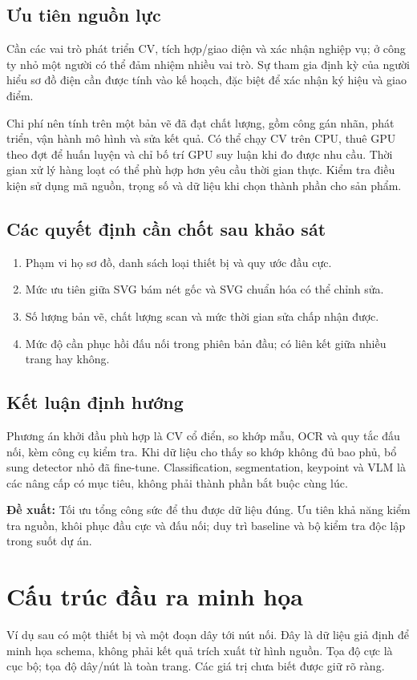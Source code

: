 \documentclass[11pt,a4paper]{article}
\newcommand{\decision}[1]{\par\smallskip\noindent\colorbox{Pale}{\parbox{\dimexpr\linewidth-2\fboxsep\relax}{\textbf{Đề xuất:} #1}}\par\smallskip}
\begin{document}
\subsection{Ưu tiên nguồn lực}
Cần các vai trò phát triển CV, tích hợp/giao diện và xác nhận nghiệp vụ; ở công ty nhỏ một người có thể đảm nhiệm nhiều vai trò. Sự tham gia định kỳ của người hiểu sơ đồ điện cần được tính vào kế hoạch, đặc biệt để xác nhận ký hiệu và giao điểm.

Chi phí nên tính trên một bản vẽ đã đạt chất lượng, gồm công gán nhãn, phát triển, vận hành mô hình và sửa kết quả. Có thể chạy CV trên CPU, thuê GPU theo đợt để huấn luyện và chỉ bố trí GPU suy luận khi đo được nhu cầu. Thời gian xử lý hàng loạt có thể phù hợp hơn yêu cầu thời gian thực. Kiểm tra điều kiện sử dụng mã nguồn, trọng số và dữ liệu khi chọn thành phần cho sản phẩm.

\subsection{Các quyết định cần chốt sau khảo sát}
\begin{enumerate}
\item Phạm vi họ sơ đồ, danh sách loại thiết bị và quy ước đầu cực.
\item Mức ưu tiên giữa SVG bám nét gốc và SVG chuẩn hóa có thể chỉnh sửa.
\item Số lượng bản vẽ, chất lượng scan và mức thời gian sửa chấp nhận được.
\item Mức độ cần phục hồi đấu nối trong phiên bản đầu; có liên kết giữa nhiều trang hay không.
\end{enumerate}

\subsection{Kết luận định hướng}
Phương án khởi đầu phù hợp là CV cổ điển, so khớp mẫu, OCR và quy tắc đấu nối, kèm công cụ kiểm tra. Khi dữ liệu cho thấy so khớp không đủ bao phủ, bổ sung detector nhỏ đã fine-tune. Classification, segmentation, keypoint và VLM là các nâng cấp có mục tiêu, không phải thành phần bắt buộc cùng lúc.

\decision{Tối ưu tổng công sức để thu được dữ liệu đúng. Ưu tiên khả năng kiểm tra nguồn, khôi phục đầu cực và đấu nối; duy trì baseline và bộ kiểm tra độc lập trong suốt dự án.}

\clearpage
\appendix
\section{Cấu trúc đầu ra minh họa}
Ví dụ sau có một thiết bị và một đoạn dây tới nút nối. Đây là dữ liệu giả định để minh họa schema, không phải kết quả trích xuất từ hình nguồn. Tọa độ cực là cục bộ; tọa độ dây/nút là toàn trang. Các giá trị chưa biết được giữ rõ ràng.

\end{document}
